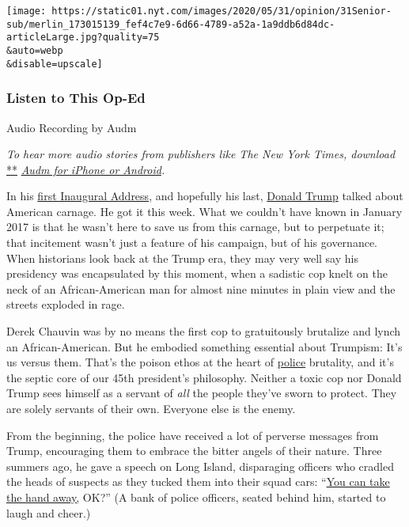 \texttt{[image: https://static01.nyt.com/images/2020/05/31/opinion/31Senior-sub/merlin\_173015139\_fef4c7e9-6d66-4789-a52a-1a9ddb6d84dc-articleLarge.jpg?quality=75\\\&auto=webp\\\&disable=upscale]}

\hypertarget{listen-to-this-op-ed}{%
\subsubsection{Listen to This Op-Ed}\label{listen-to-this-op-ed}}

Audio Recording by Audm

\emph{To hear more audio stories from publishers like The New York
Times, download}
\href{https://www.audm.com/?utm_source=nytmag\&utm_medium=embed\&utm_campaign=left_behind_draper}{**}
\href{https://www.audm.com/?utm_source=nytopinion\&utm_medium=embed\&utm_campaign=trump_toxic_cops}{\emph{Audm
for iPhone or Android}}\emph{.}

In his
\href{https://www.nytimes.com/2017/01/20/us/politics/trump-resurrects-dark-definition-of-america-first-vision.html}{first
Inaugural Address}, and hopefully his last,
\href{https://www.nytimes.com/2020/06/12/us/politics/trump-police-chokeholds.html}{Donald
Trump} talked about American carnage. He got it this week. What we
couldn't have known in January 2017 is that he wasn't here to save us
from this carnage, but to perpetuate it; that incitement wasn't just a
feature of his campaign, but of his governance. When historians look
back at the Trump era, they may very well say his presidency was
encapsulated by this moment, when a sadistic cop knelt on the neck of an
African-American man for almost nine minutes in plain view and the
streets exploded in rage.

Derek Chauvin was by no means the first cop to gratuitously brutalize
and lynch an African-American. But he embodied something essential about
Trumpism: It's us versus them. That's the poison ethos at the heart of
\href{https://www.nytimes.com/2020/06/12/us/politics/trump-police-chokeholds.html}{police}
brutality, and it's the septic core of our 45th president's philosophy.
Neither a toxic cop nor Donald Trump sees himself as a servant of
\emph{all} the people they've sworn to protect. They are solely servants
of their own. Everyone else is the enemy.

From the beginning, the police have received a lot of perverse messages
from Trump, encouraging them to embrace the bitter angels of their
nature. Three summers ago, he gave a speech on Long Island, disparaging
officers who cradled the heads of suspects as they tucked them into
their squad cars:
``\href{https://www.washingtonpost.com/news/post-nation/wp/2017/07/28/trump-tells-police-not-to-worry-about-injuring-suspects-during-arrests/}{You
can take the hand away,} OK?'' (A bank of police officers, seated behind
him, started to laugh and cheer.)

